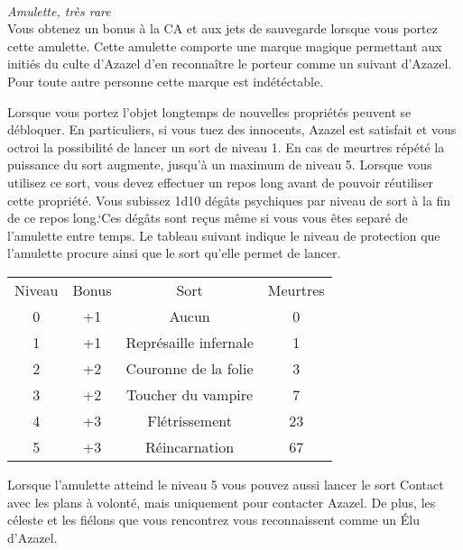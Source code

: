\\
{\small \it Amulette, très rare}\\
\label{AmuletteAzazel}
Vous obtenez un bonus à la CA et aux jets de sauvegarde lorsque vous 
portez cette amulette. Cette amulette comporte une marque magique permettant
aux initiés du culte d'Azazel d'en reconnaître le porteur comme un suivant
d'Azazel. Pour toute autre personne cette marque est indétéctable.

Lorsque vous portez l'objet longtemps de nouvelles propriétés peuvent se 
débloquer. En particuliers, si vous tuez des innocents, Azazel est satisfait 
et vous octroi la possibilité de lancer un sort de niveau 1. En cas de meurtres 
répété la puissance du sort augmente, jusqu'à un maximum de niveau 5.
Lorsque vous utilisez ce sort, vous devez effectuer un repos long avant de
pouvoir réutiliser cette propriété. Vous subissez 1d10 dégâts psychiques par niveau de sort à
la fin de ce repos long.`Ces dégâts sont 
reçus même si vous vous êtes separé de l'amulette entre temps.
Le tableau suivant indique le niveau de protection que l'amulette procure ainsi que
le sort qu'elle permet de lancer.

\begin{center}
\setlength{\tabcolsep}{4pt}
\begin{tabular}{cccc}
Niveau & Bonus & Sort & Meurtres \\
   \rowcolor{LightCyan}
 0 & +1 & Aucun & 0  \\
 1 & +1 & Représaille infernale & 1 \\
   \rowcolor{LightCyan}
 2 & +2 & Couronne de la folie & 3 \\
 3 & +2 & Toucher du vampire & 7 \\
   \rowcolor{LightCyan}
 4 & +3 & Flétrissement & 23 \\
 5 & +3 & Réincarnation & 67 \\
\end{tabular}
\end{center}

Lorsque l'amulette atteind le niveau 5 vous pouvez aussi lancer le sort Contact avec 
les plans à volonté, mais uniquement pour contacter Azazel. De plus, les céleste et les fiélons 
que vous rencontrez vous reconnaissent comme un Élu d'Azazel. \\

